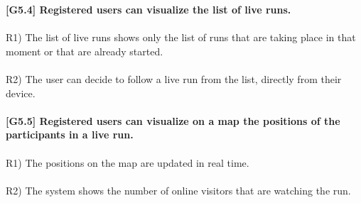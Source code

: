 \textbf{[G5.4] Registered users can visualize the list of live runs.} \\ \\
R1) The list of live runs shows only the list of runs that are taking place in that moment or that are already started. \\ \\
R2) The user can decide to follow a live run from the list, directly from their device. \\ \\
\textbf{[G5.5] Registered users can visualize on a map the positions of the participants in a live run.} \\ \\	
R1) The positions on the map are updated in real time. \\ \\
R2) The system shows the number of online visitors that are watching the run. \\


